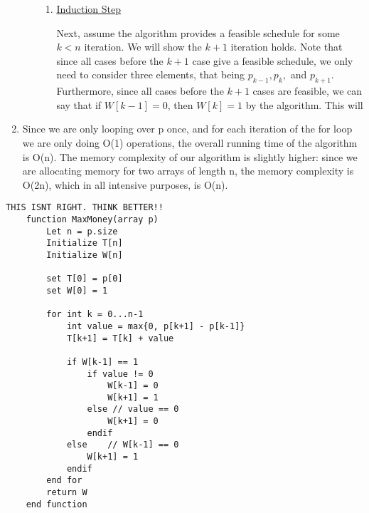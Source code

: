 \begin{solution}
\begin{enumerate}
\begin{enumerate}[-]
\begin{enumerate}[-]
                \item \underline{Induction Step}

                \hop
                Next, assume the algorithm provides a feasible schedule for some $k < n$ iteration. We will show the $k+1$ iteration holds. Note that since all cases before the $k+1$ case give a feasible schedule, we only need to consider three elements, that being $p_{k-1}, p_k,$ and $p_{k+1}$. Furthermore, since all cases before the $k+1$ cases are feasible, we can say that if $W[k-1] = 0$, then $W[k] = 1$ by the algorithm. This will 
            \end{enumerate}
        \end{enumerate}
        \alignbreak
        \item Since we are only looping over p once, and for each iteration of the for loop we are only doing O(1) operations, the overall running time of the algorithm is O(n). The memory complexity of our algorithm is slightly higher: since we are allocating memory for two arrays of length n, the memory complexity is O(2n), which in all intensive purposes, is O(n).
    \end{enumerate}
    \newpage
\begin{lstlisting}
THIS ISNT RIGHT. THINK BETTER!!
    function MaxMoney(array p)
        Let n = p.size
        Initialize T[n]
        Initialize W[n]

        set T[0] = p[0]
        set W[0] = 1

        for int k = 0...n-1 
            int value = max{0, p[k+1] - p[k-1]}
            T[k+1] = T[k] + value

            if W[k-1] == 1
                if value != 0
                    W[k-1] = 0
                    W[k+1] = 1
                else // value == 0
                    W[k+1] = 0
                endif
            else    // W[k-1] == 0
                W[k+1] = 1
            endif
        end for
        return W
    end function
\end{lstlisting}
    
\end{solution}
